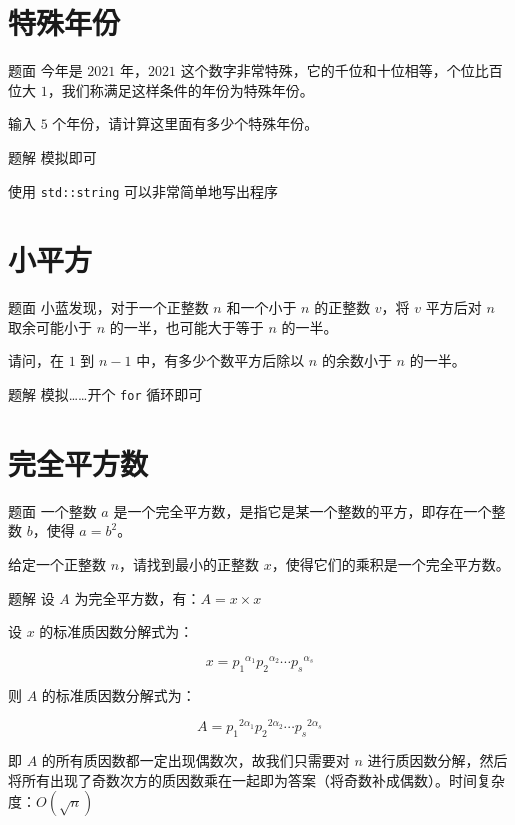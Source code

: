 \documentclass{pptt}
\begin{document}
\section{特殊年份}

\begin{frame}{题面}
    今年是 $2021$ 年，$2021$ 这个数字非常特殊，它的千位和十位相等，个位比百位大 $1$，我们称满足这样条件的年份为特殊年份。

    输入 $5$ 个年份，请计算这里面有多少个特殊年份。
\end{frame}

\begin{frame}{题解}
    模拟即可

    使用 \texttt{std::string} 可以非常简单地写出程序
\end{frame}

\section{小平方}

\begin{frame}{题面}
    小蓝发现，对于一个正整数 $n$ 和一个小于 $n$ 的正整数 $v$，将 $v$ 平方后对 $n$ 取余可能小于 $n$ 的一半，也可能大于等于 $n$ 的一半。

    请问，在 $1$ 到 $n-1$ 中，有多少个数平方后除以 $n$ 的余数小于 $n$ 的一半。
\end{frame}

\begin{frame}{题解}
    模拟……开个 \texttt{for} 循环即可
\end{frame}

\section{完全平方数}

\begin{frame}{题面}
    一个整数 $a$ 是一个完全平方数，是指它是某一个整数的平方，即存在一个整数 $b$，使得 $a=b^2$。

    给定一个正整数 $n$，请找到最小的正整数 $x$，使得它们的乘积是一个完全平方数。
\end{frame}

\begin{frame}{题解}
    设 $A$ 为完全平方数，有：$A=x \times x$

    设 $x$ 的标准质因数分解式为：

    $$x={p_1}^{\alpha_1}{p_2}^{\alpha_2} \cdots {p_s}^{\alpha_s}$$

    则 $A$ 的标准质因数分解式为：

    $$A={p_1}^{2\alpha_1}{p_2}^{2\alpha_2} \cdots {p_s}^{2\alpha_s}$$

    即 $A$ 的所有质因数都一定出现偶数次，故我们只需要对 $n$ 进行质因数分解，然后将所有出现了奇数次方的质因数乘在一起即为答案（将奇数补成偶数）。时间复杂度：$O(\sqrt n)$
\end{frame}
\end{document}
